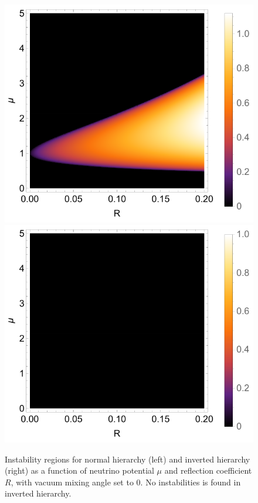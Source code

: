 \begin{figure}[htbp]
    \includegraphics[width=\textwidth]{chapters/assets/halo/growth-rate-mu-refl-nh}
    \endminipage\hfill
    \includegraphics[width=\textwidth]{chapters/assets/halo/growth-rate-mu-refl-ih}
    \endminipage\hfill
    \caption{Instability regions for normal hierarchy (left) and inverted hierarchy (right) as a function of neutrino potential $\mu$ and reflection coefficient $R$, with vacuum mixing angle set to 0. No instabilities is found in inverted hierarchy.}
    \label{chap:halo-sec:line-sym-fig:instability-regions}
\end{figure}







